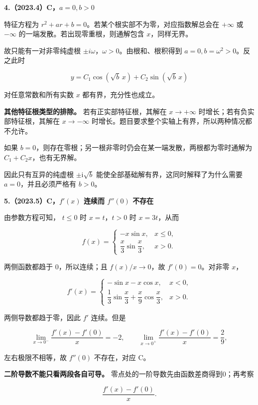 \documentclass[UTF8,11pt,fontset=windows]{ctexart}
\begin{document}
\clearpage

\textbf{4.（2023.4）C，$a=0,b>0$}

特征方程为 $r^2+ar+b=0$。若某个根实部不为零，对应指数解总会在 $+\infty$ 或 $-\infty$ 的一端发散。若出现零重根，则通解包含 $x$，同样无界。

故只能有一对非零纯虚根 $\pm i\omega$，$\omega>0$。由根和、根积得到 $a=0,b=\omega^2>0$。反之此时

$$
y=C_1\cos(\sqrt b\,x)+C_2\sin(\sqrt b\,x)
$$

对任意常数和所有实数 $x$ 都有界，充分性也成立。

\textbf{其他特征根类型的排除。} 若有正实部特征根，其解在 $x\to+\infty$ 时增长；若有负实部特征根，其解在 $x\to-\infty$ 时增长。题目要求整个实轴上有界，所以两种情况都不允许。

如果 $b=0$，则存在零根；另一根非零时仍会在某一端发散，两根都为零时通解为 $C_1+C_2x$，也有无界解。

因此只有互异的纯虚根 $\pm\mathrm i\sqrt b$ 能使全部基础解有界，这同时解释了为什么需要 $a=0$，并且必须严格有 $b>0$。

\clearpage

\textbf{5.（2023.5）C，$f'(x)$ 连续而 $f''(0)$ 不存在}

由参数方程可知， $t\le0$ 时 $x=t$，$t>0$ 时 $x=3t$，从而

$$
f(x)=\begin{cases}-x\sin x,&x\le0,\\[2pt]\dfrac x3\sin\dfrac x3,&x>0.\end{cases}
$$

两侧函数都趋于 $0$，所以连续；且 $f(x)/x\to0$，故 $f'(0)=0$。对非零 $x$，

$$
f'(x)=\begin{cases}-\sin x-x\cos x,&x<0,\\[2pt]\dfrac13\sin\dfrac x3+\dfrac x9\cos\dfrac x3,&x>0.\end{cases}
$$

两侧导数都趋于零，因此 $f'$ 连续。但是

$$
\lim_{x\to0^-}\frac{f'(x)-f'(0)}x=-2,\qquad
\lim_{x\to0^+}\frac{f'(x)-f'(0)}x=\frac29,
$$

左右极限不相等，故 $f''(0)$ 不存在，对应 C。

\textbf{二阶导数不能只看两段各自可导。} 零点处的一阶导数先由函数差商得到0；再考察

$$
\frac{f'(x)-f'(0)}x.
$$
\end{document}
